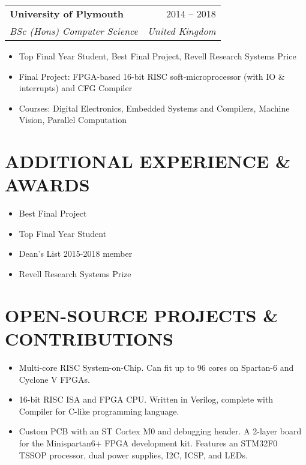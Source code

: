 \documentclass[letterpaper,11pt]{article}
\makeatletter
\newcommand{\resumeItem}[1]{
  \item\small{
    {#1 \vspace{-5pt}}
  }
}
\newcommand{\resumeSubheading}[4]{
  \vspace{-1pt}
    \begin{tabular*}{\textwidth}{l@{\extracolsep{\fill}}r}
      \textbf{#1} & #2 \\
      \textit{#3} & \textit{#4} \\
    \end{tabular*}\vspace{-3pt}
}
\newcommand{\resumeItemListStart}{\begin{itemize}}
\newcommand{\resumeItemListEnd}{\end{itemize}\vspace{-5pt}}
\makeatother
\begin{document}
     \vspace{10pt}
     \resumeSubheading{University of Plymouth}{2014 -- 2018}{BSc (Hons) Computer Science}{United Kingdom}
    \resumeItemListStart
        \resumeItem{Top Final Year Student, Best Final Project, Revell Research Systems Price}
        \resumeItem{Final Project: FPGA-based 16-bit RISC soft-microprocessor (with IO \& interrupts) and CFG Compiler}
        \resumeItem{Courses: Digital Electronics, Embedded Systems and Compilers, Machine Vision, Parallel Computation}
    \resumeItemListEnd

\vspace{10pt}
\section{ADDITIONAL EXPERIENCE \& AWARDS}
    \vspace{-15pt}
\begin{multicols}{2}
    \resumeItemListStart
    \resumeItem{Best Final Project}
    \resumeItem{Top Final Year Student}
    \resumeItemListEnd
\columnbreak
    \resumeItemListStart
    \resumeItem{Dean’s List 2015-2018 member}
    \resumeItem{Revell Research Systems Prize}
    \resumeItemListEnd
\end{multicols}\vspace{5pt}

\section{OPEN-SOURCE PROJECTS \& CONTRIBUTIONS}
    \resumeItemListStart
    \resumeItem{Multi-core RISC System-on-Chip. Can fit up to 96 cores on Spartan-6 and Cyclone V FPGAs.}
    \resumeItem{16-bit RISC ISA and FPGA CPU. Written in Verilog, complete with Compiler for C-like programming language.}
    \resumeItem{Custom PCB with an ST Cortex M0 and debugging header. A 2-layer board for the Minispartan6+ FPGA development kit. Features an STM32F0 TSSOP processor, dual power supplies, I2C, ICSP, and LEDs.}
\resumeItemListEnd

\end{document}
